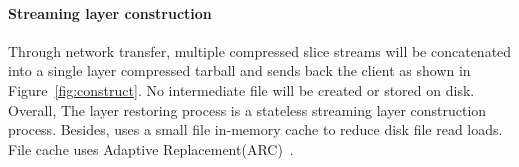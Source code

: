 \paragraph{Streaming layer construction}
Through network transfer, 
multiple compressed slice streams will be concatenated into a single layer compressed tarball
and sends back the client as shown in Figure~\ref{fig:construct}.
No intermediate file will be created or stored on disk. %
%
Overall,
The layer restoring process is a stateless streaming layer construction process.
%
Besides,
\sysname uses a small file in-memory cache to reduce disk file read loads. 
File cache uses Adaptive Replacement(ARC)~\cite{xxx}.

 
